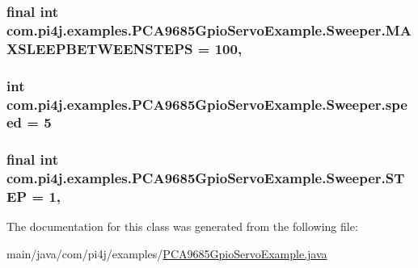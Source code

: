 \subsubsection[{M\+A\+X\+S\+L\+E\+E\+P\+B\+E\+T\+W\+E\+E\+N\+S\+T\+E\+P\+S}]{\setlength{\rightskip}{0pt plus 5cm}final int com.\+pi4j.\+examples.\+P\+C\+A9685\+Gpio\+Servo\+Example.\+Sweeper.\+M\+A\+X\+S\+L\+E\+E\+P\+B\+E\+T\+W\+E\+E\+N\+S\+T\+E\+P\+S = 100\hspace{0.3cm}{\ttfamily [static]}, {\ttfamily [private]}}\label{classcom_1_1pi4j_1_1examples_1_1PCA9685GpioServoExample_1_1Sweeper_a7643dfab6ffcfd44d60f83b03b507ab1}
\hypertarget{classcom_1_1pi4j_1_1examples_1_1PCA9685GpioServoExample_1_1Sweeper_a687365830c8cf1d68b44afc369bed00f}{}
\subsubsection[{speed}]{\setlength{\rightskip}{0pt plus 5cm}int com.\+pi4j.\+examples.\+P\+C\+A9685\+Gpio\+Servo\+Example.\+Sweeper.\+speed = 5\hspace{0.3cm}{\ttfamily [private]}}\label{classcom_1_1pi4j_1_1examples_1_1PCA9685GpioServoExample_1_1Sweeper_a687365830c8cf1d68b44afc369bed00f}
\hypertarget{classcom_1_1pi4j_1_1examples_1_1PCA9685GpioServoExample_1_1Sweeper_a5616b6c917a05769e3b3344710f6db3f}{}
\subsubsection[{S\+T\+E\+P}]{\setlength{\rightskip}{0pt plus 5cm}final int com.\+pi4j.\+examples.\+P\+C\+A9685\+Gpio\+Servo\+Example.\+Sweeper.\+S\+T\+E\+P = 1\hspace{0.3cm}{\ttfamily [static]}, {\ttfamily [private]}}\label{classcom_1_1pi4j_1_1examples_1_1PCA9685GpioServoExample_1_1Sweeper_a5616b6c917a05769e3b3344710f6db3f}


The documentation for this class was generated from the following file\+:\begin{DoxyCompactItemize}
\item 
main/java/com/pi4j/examples/\hyperlink{PCA9685GpioServoExample_8java}{P\+C\+A9685\+Gpio\+Servo\+Example.\+java}\end{DoxyCompactItemize}
